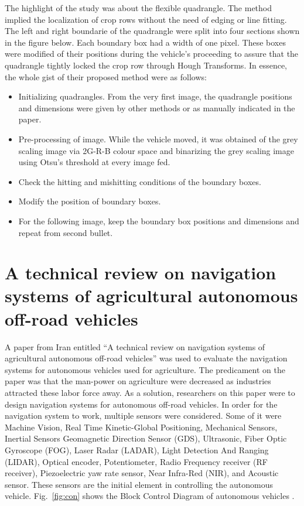     The highlight of the study was about the flexible quadrangle. The method implied the localization of crop rows without the need of edging or line fitting. The left and right boundarie of the quadrangle were split into four sections shown in the figure below. Each boundary box had a width of one pixel. These boxes were modified of their positions during the vehicle’s proceeding to assure that the quadrangle tightly locked the crop row through Hough Transforms. In essence, the whole gist of their proposed method were as follows:
    \begin{itemize}
\item Initializing quadrangles. From the very first image, the quadrangle positions and dimensions were given by other methods or as manually indicated in the paper.
\item Pre-processing of image. While the vehicle moved, it was obtained of the grey scaling image via 2G-R-B colour space and binarizing the grey scaling image using Otsu’s threshold at every image fed.
\item Check the hitting and mishitting conditions of the boundary boxes.
\item Modify the position of boundary boxes.
\item For the following image, keep the boundary box positions and dimensions and repeat from second bullet.
\end{itemize}

\section{A technical review on navigation systems of agricultural autonomous off-road vehicles}

A paper from Iran entitled “A technical review on navigation systems of agricultural autonomous off-road vehicles” was used to evaluate the navigation systems for autonomous vehicles used for agriculture. The predicament on the paper was that the man-power on agriculture were decreased as industries attracted these labor force away. As a solution, researchers on this paper were to design navigation systems for autonomous off-road vehicles. In order for the navigation system to work, multiple sensors were considered. Some of it were Machine Vision, Real Time Kinetic-Global Positioning, Mechanical Sensors, Inertial Sensors Geomagnetic Direction Sensor (GDS), Ultrasonic, Fiber Optic Gyroscope (FOG), Laser Radar (LADAR), Light Detection And Ranging (LIDAR), Optical encoder, Potentiometer, Radio Frequency receiver (RF receiver), Piezoelectric yaw rate sensor, Near Infra-Red (NIR), and Acoustic sensor. These sensors are the initial element in controlling the autonomous vehicle. Fig.~\ref{fig:con} shows the Block Control Diagram of autonomous vehicles \cite{Hossein2013}.

